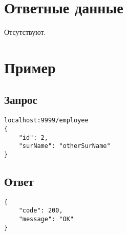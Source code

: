 \section*{Ответные данные}
Отсутствуют.

\section*{Пример}

\subsection*{Запрос}

\begin{lstlisting}
localhost:9999/employee
{
	"id": 2,
	"surName": "otherSurName"
}
\end{lstlisting}
\hfill

\subsection*{Ответ}

\begin{lstlisting}
{
	"code": 200,
	"message": "OK"
}
\end{lstlisting}
\hfill